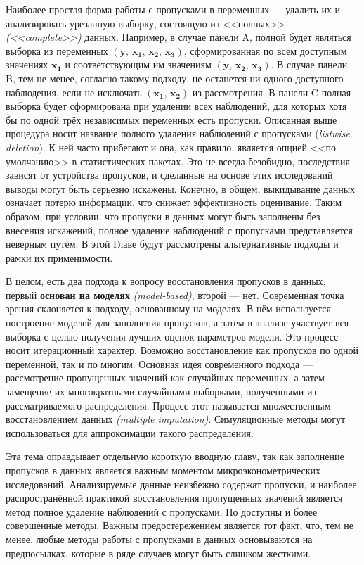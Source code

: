 Наиболее простая форма работы с пропусками в переменных --– удалить их и анализировать урезанную выборку, состоящую из <<полных>> \emph{(<<complete>>)} данных. Например, в случае панели A, полной будет являться выборка из переменных $(\mathbf{y, \, x_1, \, x_2, \, x_3})$, сформированная по всем доступным значениях $\mathbf{x_1}$ и соответствующим им значениям $(\mathbf{y, \, x_2, \, x_3})$. В случае панели B, тем не менее, согласно такому подходу, не останется ни одного доступного наблюдения, если не исключать $(\mathbf{x_1, \, x_2})$ из рассмотрения. В панели C полная выборка будет сформирована при удалении всех наблюдений, для которых хотя бы по одной трёх независимых переменных есть пропуски.
Описанная выше процедура носит название полного удаления наблюдений с пропусками (\emph{listwise deletion}). К ней часто прибегают и она, как правило, является опцией <<по умолчанию>> в статистических пакетах. Это не всегда безобидно, последствия зависят от устройства пропусков, и сделанные на основе этих исследований выводы могут быть серьезно искажены. Конечно, в общем, выкидывание данных означает потерю информации, что снижает эффективность оценивание. Таким образом, при условии, что пропуски в данных могут быть заполнены без внесения искажений, полное удаление наблюдений с пропусками представляется неверным путём. В этой Главе будут рассмотрены альтернативные подходы и рамки их применимости.

В целом, есть два подхода к вопросу восстановления пропусков в данных, первый {\bf основан на моделях} \emph{(model-based)}, второй --- нет. Современная точка зрения склоняется к подходу, основанному на моделях. В нём используется построение моделей для заполнения пропусков, а затем в анализе участвует вся выборка с целью получения лучших оценок параметров модели.  Это процесс носит итерационный характер. Возможно восстановление как пропусков по одной переменной, так и по многим. Основная идея современного подхода --- рассмотрение пропущенных значений как случайных переменных, а затем замещение их многократными случайными выборками, полученными из рассматриваемого распределения. Процесс этот называется множественным восстановлением данных \emph{(multiple imputation)}. Симуляционные методы могут использоваться для аппроксимации такого распределения.

Эта тема оправдывает отдельную короткую вводную главу, так как заполнение пропусков в данных является важным моментом микроэконометрических исследований. Анализируемые данные неизбежно содержат пропуски, и наиболее распространённой практикой восстановления пропущенных значений является метод полное удаление наблюдений с пропусками. Но доступны и более совершенные методы. Важным предостережением является тот факт, что, тем не менее, любые методы работы с пропусками в данных основываются на предпосылках, которые в ряде случаев могут быть слишком жесткими.

